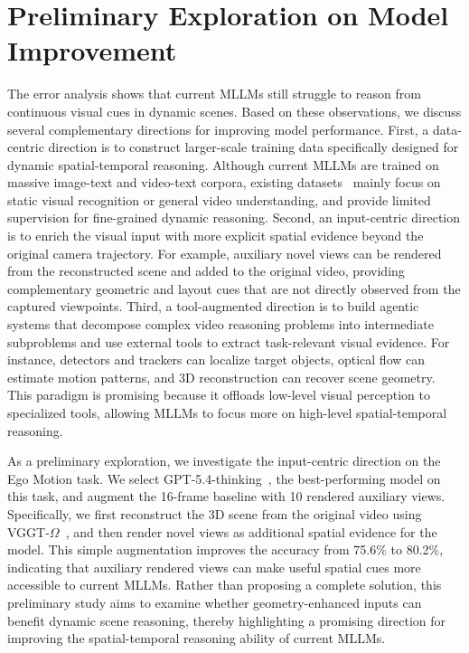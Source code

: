 \section{Preliminary Exploration on Model Improvement}
\label{sec:model_improvement}

The error analysis shows that current MLLMs still struggle to reason from continuous visual cues in dynamic scenes.
Based on these observations, we discuss several complementary directions for improving model performance.
First, a data-centric direction is to construct larger-scale training data specifically designed for dynamic spatial-temporal reasoning.
Although current MLLMs are trained on massive image-text and video-text corpora, existing datasets~\citep{SPAR-Bench,LLaVA-Video} mainly focus on static visual recognition or general video understanding, and provide limited supervision for fine-grained dynamic reasoning.
Second, an input-centric direction is to enrich the visual input with more explicit spatial evidence beyond the original camera trajectory.
For example, auxiliary novel views can be rendered from the reconstructed scene and added to the original video, providing complementary geometric and layout cues that are not directly observed from the captured viewpoints.
Third, a tool-augmented direction is to build agentic systems that decompose complex video reasoning problems into intermediate subproblems and use external tools to extract task-relevant visual evidence.
For instance, detectors and trackers can localize target objects, optical flow can estimate motion patterns, and 3D reconstruction can recover scene geometry.
This paradigm is promising because it offloads low-level visual perception to specialized tools, allowing MLLMs to focus more on high-level spatial-temporal reasoning.

As a preliminary exploration, we investigate the input-centric direction on the Ego Motion task.
We select GPT-5.4-thinking~\citep{GPT-5}, the best-performing model on this task, and augment the 16-frame baseline with 10 rendered auxiliary views.
Specifically, we first reconstruct the 3D scene from the original video using VGGT-$\Omega$~\citep{VGGT-Omega}, and then render novel views as additional spatial evidence for the model.
This simple augmentation improves the accuracy from 75.6\% to 80.2\%, indicating that auxiliary rendered views can make useful spatial cues more accessible to current MLLMs.
Rather than proposing a complete solution, this preliminary study aims to examine whether geometry-enhanced inputs can benefit dynamic scene reasoning, thereby highlighting a promising direction for improving the spatial-temporal reasoning ability of current MLLMs.

